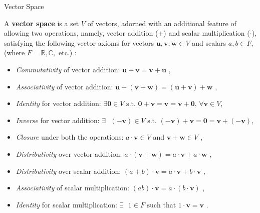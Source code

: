 \documentclass{beamer}
\newcommand\boldtext[1]{\textcolor{bolds}{\textbf{#1}}}
\newcommand\italictext[1]{\textcolor{italics}{\textit{#1}}}
\begin{document}
\begin{frame}{Vector Space}
    \begin{definition}
        A \boldtext{vector space} is a set $V$ of vectors, adorned with an additional feature of allowing two operations, namely, vector addition ($+$) and scalar multiplication ($\cdot$), satisfying the following vector axioms for vectors $\mathbf{u},\mathbf{v},\mathbf{w} \in {V}$ and scalars $a,b \in {F}$, (where $F=\mathbb{R}, \mathbb{C},$ etc.) :
        \begin{itemize}
            \item \italictext{Commutativity} of vector addition: $\mathbf{u}+\mathbf{v}=\mathbf{v}+\mathbf{u}$ ,
            \item \italictext{Associativity} of vector addition: $\mathbf{u}+(\mathbf{v}+\mathbf{w})=(\mathbf{u}+\mathbf{v})+\mathbf{w}$ ,
            \item \italictext{Identity} for vector addition: $\exists \mathbf{ 0}\in V \text{ s.t. } \mathbf{0}+\mathbf{v}=\mathbf{v}=\mathbf{v}+\mathbf{0} \text{,  } \forall \mathbf{ v}\in V$,
            \item \italictext{Inverse} for vector addition: $\exists \text{ }(-\mathbf{v})\in \textit{V} \text{ s.t. } (-\mathbf{v})+\mathbf{v}=\mathbf{0}=\mathbf{v}+(-\mathbf{v})$,
            \item \italictext{Closure} under both the operations: $a\cdot\mathbf{v}\in V$ and $\mathbf{v}+\mathbf{w}\in V$ ,
            \item \italictext{Distributivity} over vector addition: $a\cdot(\mathbf{v}+\mathbf{w})=a\cdot\mathbf{v}+a\cdot\mathbf{w}$ ,
            \item \italictext{Distributivity} over scalar addition: $(a+b)\cdot\mathbf{v}=a\cdot\mathbf{v}+b\cdot\mathbf{v}$ ,
            \item \italictext{Associativity} of scalar multiplication: $(ab)\cdot\mathbf{v}=a\cdot(b\cdot\mathbf{v})$ ,
            \item \italictext{Identity} for scalar multiplication: $\exists \text{ } 1 \in F \text{ such that } 1\cdot\mathbf{v}=\mathbf{v}$ .
        \end{itemize}
    \end{definition}
\end{frame}
\end{document}
